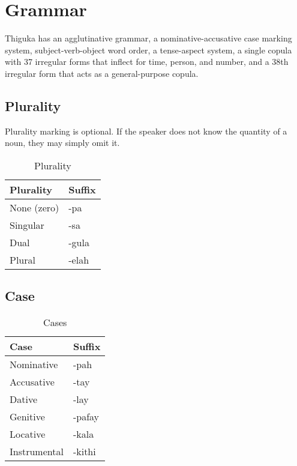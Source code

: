 
\newpage
\section{Grammar}
Thiguka has an agglutinative grammar, a nominative-accusative case marking system, subject-verb-object word order, a tense-aspect system, a single copula with 37 irregular forms that inflect for time, person, and number, and a 38th irregular form that acts as a general-purpose copula.

\subsection{Plurality}
Plurality marking is optional.
If the speaker does not know the quantity of a noun, they may simply omit it.

\begin{table}[h!]
    \centering
    \caption{Plurality}
    \begin{tabularx}{8cm}{|X|X|}
        \hline
        \textbf{Plurality} & \textbf{Suffix} \\
        \hline
        None (zero) & -pa \\
        Singular & -sa \\
        Dual & -gula \\
        Plural & -elah \\
        \hline
    \end{tabularx}
\end{table}

\subsection{Case}
\begin{table}[h!]
    \centering
    \caption{Cases}
    \begin{tabularx}{8cm}{|X|X|}
        \hline
        \textbf{Case} & \textbf{Suffix} \\
        \hline
        Nominative & -pah \\
        Accusative & -tay \\
        Dative & -lay \\
        Genitive & -pafay \\
        Locative & -kala \\
        Instrumental & -kithi \\ 
        \hline
    \end{tabularx}
\end{table}


